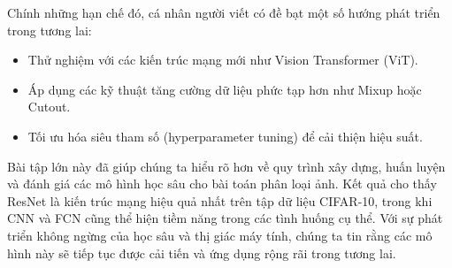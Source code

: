 \documentclass[main.tex]{subfiles}
\begin{document}
Chính những hạn chế đó, cá nhân người viết có đề bạt một số hướng phát triển trong tương lai:

\begin{itemize}
    \item Thử nghiệm với các kiến trúc mạng mới như Vision Transformer (ViT).
    \item Áp dụng các kỹ thuật tăng cường dữ liệu phức tạp hơn như Mixup hoặc Cutout.
    \item Tối ưu hóa siêu tham số (hyperparameter tuning) để cải thiện hiệu suất.
\end{itemize}

Bài tập lớn này đã giúp chúng ta hiểu rõ hơn về quy trình xây dựng, huấn luyện và đánh giá các mô hình học sâu cho bài toán phân loại ảnh. Kết quả cho thấy ResNet là kiến trúc mạng hiệu quả nhất trên tập dữ liệu CIFAR-10, trong khi CNN và FCN cũng thể hiện tiềm năng trong các tình huống cụ thể. Với sự phát triển không ngừng của học sâu và thị giác máy tính, chúng ta tin rằng các mô hình này sẽ tiếp tục được cải tiến và ứng dụng rộng rãi trong tương lai.
\end{document}
